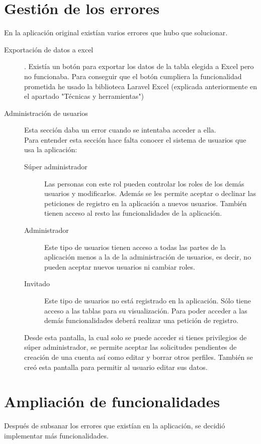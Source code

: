 \section{Gestión de los errores}
En la aplicación original existían varios errores que hubo que solucionar. 
\begin{description}
    \item [Exportación de datos a excel]. Existía un botón para exportar los datos de la tabla elegida a Excel pero no funcionaba. Para conseguir que el botón cumpliera la funcionalidad prometida he usado la biblioteca Laravel Excel (explicada anteriormente en el apartado "Técnicas y herramientas")
    \item[Administración de usuarios] Esta sección daba un error cuando se intentaba acceder a ella.\\
    Para entender esta sección hace falta conocer el sistema de usuarios que usa la aplicación:
    \begin{description}
        \item [Súper administrador] Las personas con este rol pueden controlar los roles de los demás usuarios y modificarlos.
        Además se les permite aceptar o declinar las peticiones de registro en la aplicación a nuevos usuarios. También tienen acceso al resto las funcionalidades de la aplicación.
        \item [Administrador] Este tipo de usuarios tienen acceso a todas las partes de la aplicación menos a la de la administración de usuarios, es decir, no pueden aceptar nuevos usuarios ni cambiar roles.
        \item [Invitado] Este tipo de usuarios no está registrado en la aplicación. Sólo tiene acceso a las tablas para su visualización. Para poder acceder a las demás funcionalidades deberá realizar una petición de registro.
    \end{description}
    Desde esta pantalla, la cual solo se puede acceder si tienes privilegios de súper administrador, se permite aceptar las solicitudes pendientes de creación de una cuenta así como editar y borrar otros perfiles.
    También se creó esta pantalla para permitir al usuario editar sus datos.
\end{description}
\section{Ampliación de funcionalidades}
Después de subsanar los errores que existían en la aplicación, se decidió implementar más funcionalidades.\\
